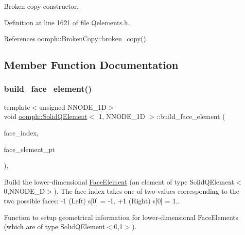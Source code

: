 Broken copy constructor. 



Definition at line 1621 of file Qelements.\+h.



References oomph\+::\+Broken\+Copy\+::broken\+\_\+copy().



\subsection{Member Function Documentation}
\mbox{\label{classoomph_1_1SolidQElement_3_011_00_01NNODE__1D_01_4_ad641fb5cfe3c380c1d6e22f161b9f2b8}} 
\subsubsection{\texorpdfstring{build\+\_\+face\+\_\+element()}{build\_face\_element()}}
{\footnotesize\ttfamily template$<$unsigned N\+N\+O\+D\+E\+\_\+1D$>$ \\
void \hyperlink{classoomph_1_1SolidQElement}{oomph\+::\+Solid\+Q\+Element}$<$ 1, N\+N\+O\+D\+E\+\_\+1D $>$\+::build\+\_\+face\+\_\+element (\begin{DoxyParamCaption}\item[{const int \&}]{face\+\_\+index,  }\item[{\hyperlink{classoomph_1_1FaceElement}{Face\+Element} $\ast$}]{face\+\_\+element\+\_\+pt }\end{DoxyParamCaption})\hspace{0.3cm}{\ttfamily [inline]}, {\ttfamily [virtual]}}



Build the lower-\/dimensional \hyperlink{classoomph_1_1FaceElement}{Face\+Element} (an element of type Solid\+Q\+Element$<$0,\+N\+N\+O\+D\+E\+\_\+D$>$). The face index takes one of two values corresponding to the two possible faces\+: -\/1 (Left) s\mbox{[}0\mbox{]} = -\/1. +1 (Right) s\mbox{[}0\mbox{]} = 1.. 

Function to setup geometrical information for lower-\/dimensional Face\+Elements (which are of type Solid\+Q\+Element$<$0,1$>$). 

